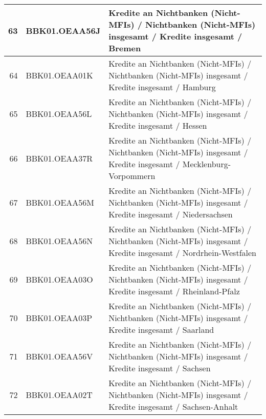 \documentclass[11pt]{article}
\begin{document}
\begin{table}
\begin{tabular}{rp{5cm}p{11cm}}
  \hline
  63 & BBK01.OEAA56J & Kredite an Nichtbanken (Nicht-MFIs) / Nichtbanken (Nicht-MFIs) insgesamt / Kredite insgesamt / Bremen \\ 
  \hline
  64 & BBK01.OEAA01K & Kredite an Nichtbanken (Nicht-MFIs) / Nichtbanken (Nicht-MFIs) insgesamt / Kredite insgesamt / Hamburg \\ 
  \hline
  65 & BBK01.OEAA56L & Kredite an Nichtbanken (Nicht-MFIs) / Nichtbanken (Nicht-MFIs) insgesamt / Kredite insgesamt / Hessen \\ 
  \hline
  66 & BBK01.OEAA37R & Kredite an Nichtbanken (Nicht-MFIs) / Nichtbanken (Nicht-MFIs) insgesamt / Kredite insgesamt / Mecklenburg-Vorpommern \\ 
  \hline
  67 & BBK01.OEAA56M & Kredite an Nichtbanken (Nicht-MFIs) / Nichtbanken (Nicht-MFIs) insgesamt / Kredite insgesamt / Niedersachsen \\ 
  \hline
  68 & BBK01.OEAA56N & Kredite an Nichtbanken (Nicht-MFIs) / Nichtbanken (Nicht-MFIs) insgesamt / Kredite insgesamt / Nordrhein-Westfalen \\ 
  \hline
  69 & BBK01.OEAA03O & Kredite an Nichtbanken (Nicht-MFIs) / Nichtbanken (Nicht-MFIs) insgesamt / Kredite insgesamt / Rheinland-Pfalz \\ 
  \hline
  70 & BBK01.OEAA03P & Kredite an Nichtbanken (Nicht-MFIs) / Nichtbanken (Nicht-MFIs) insgesamt / Kredite insgesamt / Saarland \\ 
  \hline
  71 & BBK01.OEAA56V & Kredite an Nichtbanken (Nicht-MFIs) / Nichtbanken (Nicht-MFIs) insgesamt / Kredite insgesamt / Sachsen \\ 
  \hline
  72 & BBK01.OEAA02T & Kredite an Nichtbanken (Nicht-MFIs) / Nichtbanken (Nicht-MFIs) insgesamt / Kredite insgesamt / Sachsen-Anhalt \\ 

 \end{tabular}
\end{table}
\end{document}
